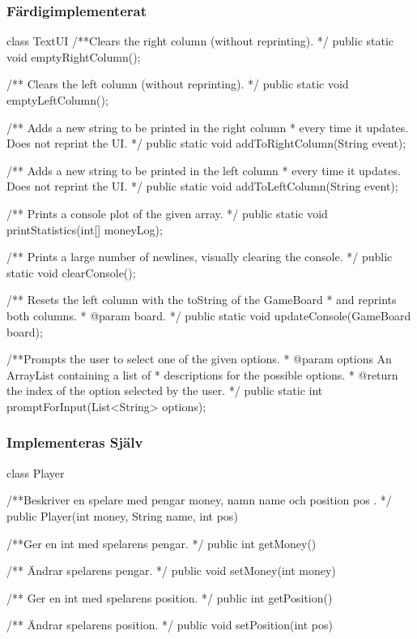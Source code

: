 \subsubsection{Färdigimplementerat}
\begin{JavaSpec}{class TextUI}
     /**Clears the right column (without reprinting). */
    public static void emptyRightColumn();

    /** Clears the left column (without reprinting). */
    public static void emptyLeftColumn();

    /** Adds a new string to be printed in the right column
     * every time it updates. Does not reprint the UI. */
    public static void addToRightColumn(String event);

    /** Adds a new string to be printed in the left column
     * every time it updates. Does not reprint the UI. */
    public static void addToLeftColumn(String event);

    /** Prints a console plot of the given array. */
    public static void printStatistics(int[] moneyLog);

    /** Prints a large number of newlines, visually clearing the console. */
    public static void clearConsole();

    /** Resets the left column with the toString of the GameBoard
     * and reprints both columns.
     * @param board. 
     */
    public static void updateConsole(GameBoard board);

    /**Prompts the user to select one of the given options.
     * @param options An ArrayList containing a list of
     *          descriptions for the possible options.
     * @return the index of the option selected by the user.
     */
    public static int promptForInput(List<String> options);
\end{JavaSpec}
\subsubsection{Implementeras Själv}
\begin{JavaSpec}{class Player}

/**Beskriver en spelare med pengar money, namn name och position pos . */
public Player(int money, String name, int pos)

/**Ger en int med spelarens pengar. */
public int getMoney()

/** Ändrar spelarens pengar. */
public void setMoney(int money)

/** Ger en int med spelarens position. */
public int getPosition()

/** Ändrar spelarens position. */
public void setPosition(int pos)

\end{JavaSpec}

